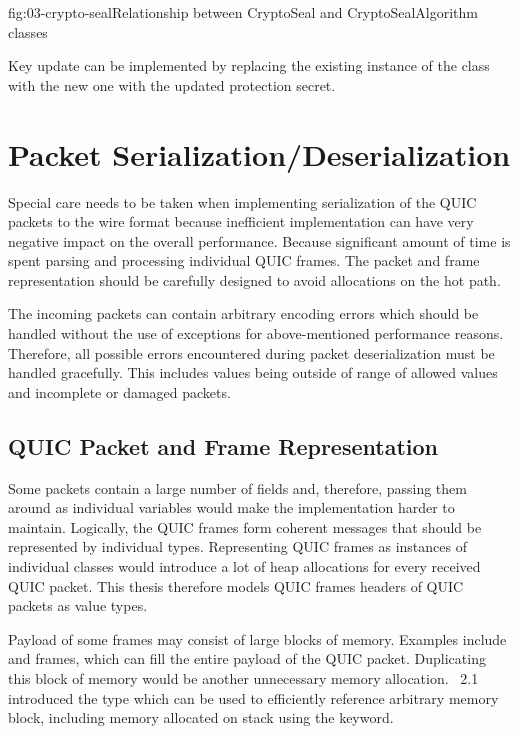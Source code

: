 \begin{myFigure}{fig:03-crypto-seal}{Relationship between CryptoSeal and CryptoSealAlgorithm classes}

  \resizebox{\linewidth}{!}{}

\end{myFigure}

Key update can be implemented by replacing the existing instance of the
\CryptoSeal{} class with the new one with the updated protection secret.

\section{Packet Serialization/Deserialization}

Special care needs to be taken when implementing serialization of the QUIC packets to the wire
format because inefficient implementation can have very negative impact on the overall performance.
Because significant amount of time is spent parsing and processing individual QUIC frames. The
packet and frame representation should be carefully designed to avoid allocations on the hot path.

The incoming packets can contain arbitrary encoding errors which should be handled without the use
of exceptions for above-mentioned performance reasons. Therefore, all possible errors encountered
during packet deserialization must be handled gracefully. This includes values being outside of
range of allowed values and incomplete or damaged packets.

\subsection{QUIC Packet and Frame Representation}

Some packets contain a large number of fields and, therefore, passing them around as individual
variables would make the implementation harder to maintain. Logically, the QUIC frames form coherent
messages that should be represented by individual \dotnet{} types.
Representing QUIC frames as instances of individual classes would introduce a lot of heap
allocations for every received QUIC packet. This thesis therefore models QUIC frames headers of QUIC
packets as value types.

Payload of some frames may consist of large blocks of memory. Examples include \STREAM{} and
\CRYPTO{} frames, which can fill the entire payload of the QUIC packet. Duplicating this block of
memory would be another unnecessary memory allocation. \dotnet{}~2.1 introduced the 
type which can be used to efficiently reference arbitrary memory block, including memory allocated
on stack using the  keyword.

